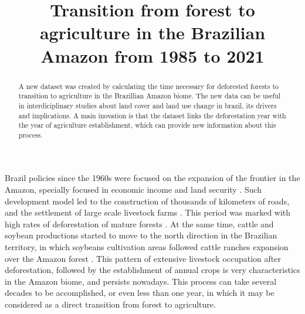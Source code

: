 \documentclass[essd, manuscript]{copernicus}
\begin{document}
\title{Transition from forest to agriculture in the Brazilian Amazon from 1985 to 2021}











\received{}
\pubdiscuss{} %
\revised{}
\accepted{}
\published{}




\maketitle


\begin{abstract}
A new dataset was created by calculating the time necessary for deforested forests to transition to agriculture in the Brazillian Amazon biome. The new data can be useful in interdiciplinary studies about land cover and land use change in brazil, its drivers and implications. A main inovation is that the dataset links the deforestation year with the year of agriculture establishment, which can provide new information about this process.
\end{abstract}




\introduction[Introduction]

Brazil policies since the 1960s were focused on the expansion of the frontier in the Amazon, specially focused in economic income and land security \citep{Carvalho2002, Mcdonald2003}.
Such development model led to the construction of thousands of kilometers of roads, and the settlement of large scale livestock farms \citep{Carvalho2002}.
This period was marked with high rates of deforestation of mature forests \citep{Fearnside2005}.
At the same time, cattle and soybean productions started to move to the north direction in the Brazilian territory, in which soybeans cultivation areas followed cattle ranches expansion over the Amazon forest \citep{Simon2005}.
This pattern of extensive livestock occupation after deforestation, followed by the establishment of annual crops is very characteristics in the Amazon biome, and persists nowadays.
This process can take several decades to be accomplished, or even less than one year, in which it may be considered as a direct transition from forest to agriculture.
\end{document}
